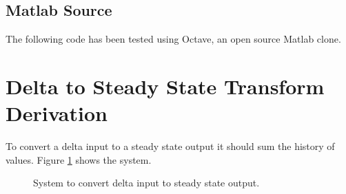 \documentclass{article}
\begin{document}
\clearpage
\subsection{Matlab Source}
\label{app:cdsrc}

The following code has been tested using Octave\autocite{octave},
an open source Matlab clone.





\clearpage





\clearpage
\section{Delta to Steady State Transform Derivation}
\label{app:dsderiv}

To convert a delta input to a steady state output it should
sum the history of values.
Figure \ref{fig:dc1} shows the system.

\begin{figure}[hpb!]
\begin{center}


\end{center}

\caption{System to convert delta input to steady state output.}
\label{fig:dc1}
\end{figure}
\end{document}
